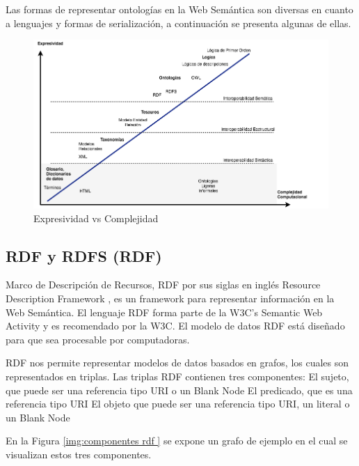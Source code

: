 Las formas de representar ontologías en la Web Semántica son diversas en cuanto a lenguajes y formas de serialización, a continuación se presenta algunas de ellas.

    \begin{figure}[h!]
    \centering
    \includegraphics[width=150mm]{figuras/Diagramas-ComplejidadOntologica}
    \caption{Expresividad vs Complejidad}
    \label{img:expresividad complejidad }
    \end{figure}



\subsection{RDF y RDFS (RDF)}

Marco de Descripción de Recursos, RDF por sus siglas en inglés Resource Description Framework \cite{rdf}, es un framework para representar información en la Web Semántica. El lenguaje RDF forma parte de la W3C's Semantic Web Activity y es recomendado por la W3C. El modelo de datos RDF está diseñado para que sea procesable por computadoras. 

RDF nos permite representar modelos de datos basados en grafos, los cuales son representados en triplas. Las triplas RDF contienen tres componentes:
El sujeto, que puede ser una referencia tipo URI o un Blank Node
El predicado, que es una referencia tipo URI
El objeto que puede ser una referencia tipo URI, un literal o un Blank Node

En la Figura \ref{img:componentes rdf } se expone un grafo de ejemplo en el cual se visualizan estos tres componentes.


